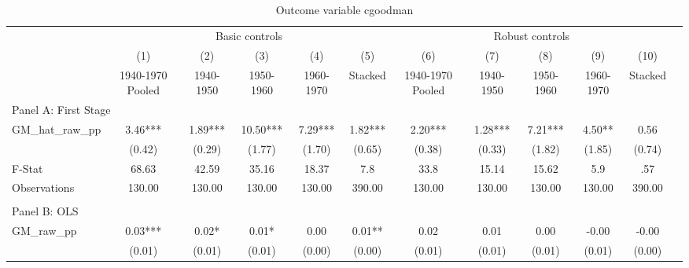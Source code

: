  \begin{table}[htbp]\centering {} \begin{threeparttable} \caption{Outcome variable cgoodman } \begin{tabular}{l*{11}{c}} \toprule
          &\multicolumn{5}{c}{Basic controls}                                   &\multicolumn{5}{c}{Robust controls}                                  \\\cmidrule(lr){2-6}\cmidrule(lr){7-11}
          &\multicolumn{1}{c}{(1)}&\multicolumn{1}{c}{(2)}&\multicolumn{1}{c}{(3)}&\multicolumn{1}{c}{(4)}&\multicolumn{1}{c}{(5)}&\multicolumn{1}{c}{(6)}&\multicolumn{1}{c}{(7)}&\multicolumn{1}{c}{(8)}&\multicolumn{1}{c}{(9)}&\multicolumn{1}{c}{(10)}\\
          &\multicolumn{1}{c}{1940-1970 Pooled}&\multicolumn{1}{c}{1940-1950}&\multicolumn{1}{c}{1950-1960}&\multicolumn{1}{c}{1960-1970}&\multicolumn{1}{c}{Stacked}&\multicolumn{1}{c}{1940-1970 Pooled}&\multicolumn{1}{c}{1940-1950}&\multicolumn{1}{c}{1950-1960}&\multicolumn{1}{c}{1960-1970}&\multicolumn{1}{c}{Stacked}\\
\cmidrule(lr){1-11}
\multicolumn{10}{l}{Panel A: First Stage}\\
\cmidrule(lr){1-11}
GM\_hat\_raw\_pp&      3.46***&      1.89***&     10.50***&      7.29***&      1.82***&      2.20***&      1.28***&      7.21***&      4.50** &      0.56   \\
          &    (0.42)   &    (0.29)   &    (1.77)   &    (1.70)   &    (0.65)   &    (0.38)   &    (0.33)   &    (1.82)   &    (1.85)   &    (0.74)   \\
\midrule
F-Stat    &     68.63   &     42.59   &     35.16   &     18.37   &       7.8   &      33.8   &     15.14   &     15.62   &       5.9   &       .57   \\
Observations&    130.00   &    130.00   &    130.00   &    130.00   &    390.00   &    130.00   &    130.00   &    130.00   &    130.00   &    390.00   \\
\cmidrule[\heavyrulewidth](lr){1-11} \\ \cmidrule[\heavyrulewidth](lr){1-11}
\multicolumn{10}{l}{Panel B: OLS}\\
\cmidrule(lr){1-11}
GM\_raw\_pp &      0.03***&      0.02*  &      0.01*  &      0.00   &      0.01** &      0.02   &      0.01   &      0.00   &     -0.00   &     -0.00   \\
          &    (0.01)   &    (0.01)   &    (0.01)   &    (0.00)   &    (0.00)   &    (0.01)   &    (0.01)   &    (0.01)   &    (0.01)   &    (0.00)   \\

\end{tabular}
\end{threeparttable}
\end{table}
